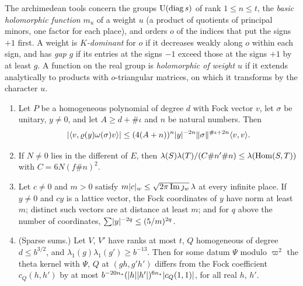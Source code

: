 The archimedean tools concern the groups $\operatorname{U}(\mathrm{diag}\,s)$ of rank $1\le n\le t$, the \emph{basic holomorphic function} $m_u$ of a weight $u$ (a product of quotients of principal minors, one factor for each place), and orders $o$ of the indices that put the
signs $+1$ first. A weight is \emph{$K$-dominant} for $o$ if it decreases weakly along $o$ within each sign, and has \emph{gap} $g$ if its entries at the signs $-1$ exceed those at the signs $+1$ by at least $g$. A function on the real group is
\emph{holomorphic of weight $u$} if it extends analytically to products with $o$-triangular matrices, on which it transforms by the character $u$.

\begin{lemma}\label{lem:sparse-sums}
\begin{enumerate}[label=\textup{(\alph*)}]
\item Let $P$ be a homogeneous polynomial of degree $d$ with Fock vector $v$, let $\sigma$ be unitary, $y\ne0$, and let $A\ge d+\#\iota$ and $n$ be natural numbers. Then
\[
  \lvert \langle v,\varrho(y)\omega(\sigma)v\rangle\rvert\le(4(A+n))^n\lvert y\rvert^{-2n}\lVert \sigma\rVert^{\#\iota+2n}\langle v,v\rangle.
\]
\item If $N\ne0$ lies in the different of $E$, then $\lambda(S)\lambda(T)/(C\#n'\#n)\le\lambda(\operatorname{Hom}(S,T))$ with $C=6N(f\#n)^2$.
\item Let $c\ne0$ and $m>0$ satisfy $m\lvert c\rvert_w\le\sqrt{2\pi\operatorname{Im}\jmath_w}\,\lambda$ at every infinite place. If $y\ne0$ and $cy$ is a lattice vector, the Fock coordinates of $y$ have norm at least $m$; distinct such vectors are at
distance at least $m$; and for $q$ above the number of coordinates, $\sum\lvert y\rvert^{-2q}\le(5/m)^{2q}$.
\item (Sparse sums.) Let $V$, $V'$ have ranks at most $t$, $Q$ homogeneous of degree $d\le b^{3/2}$, and $\lambda_1(g)\lambda_1(g')\ge b^{-13}$. Then for some datum $\Psi$ modulo $\varpi^2$ the theta kernel with $\Psi$, $Q$ at $(gh,g'h')$ differs from the Fock
coefficient $c_Q(h,h')$ by at most $b^{-20n_*}(\lvert h\rvert\lvert h'\rvert)^{6n_*}\lvert c_Q(1,1)\rvert$, for all real $h$, $h'$.
\end{enumerate}
\end{lemma}

